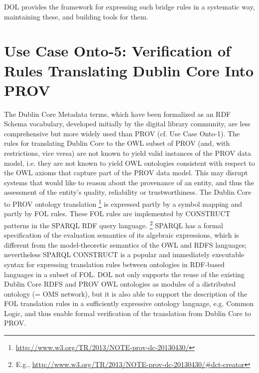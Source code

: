 \documentclass[10pt,fleqn,%
\ifpretendfinal
final%
\else
draft%
\fi,
]{scrreprt}
\begin{document}
DOL  provides the framework for expressing such bridge rules in a systematic way, maintaining these, and building tools for them. 

\section{Use Case Onto-5: Verification of Rules Translating Dublin Core Into PROV}
The Dublin Core Metadata terms, which have been formalized as an RDF Schema vocabulary, developed initially by the digital library community, are less 
comprehensive but more widely used than PROV (cf. Use Case Onto-1). The rules for translating Dublin Core to the OWL subset of PROV (and, with restrictions, 
vice versa) are not known to yield valid instances of the PROV data model, i.e. they are not known to yield OWL ontologies consistent with respect to the OWL axioms that 
capture part of the PROV data model. This may disrupt systems that would like to reason about the provenance of an entity, and thus the assessment of the 
entity's quality, reliability or trustworthiness.
The Dublin Core to PROV ontology translation%
\footnote{\url{http://www.w3.org/TR/2013/NOTE-prov-dc-20130430/}}
  is expressed partly by a symbol mapping and partly by FOL rules. These FOL rules are implemented by CONSTRUCT patterns in the SPARQL RDF query language.%
\footnote{E.g., \url{http://www.w3.org/TR/2013/NOTE-prov-dc-20130430/\#dct-creator}} 
SPARQL has a formal specification of the evaluation semantics of its algebraic expressions, which is different from the model-theoretic semantics of the OWL and RDFS languages; nevertheless SPARQL CONSTRUCT is a popular and immediately executable syntax for expressing translation rules between ontologies in RDF-based languages in a subset of FOL.
DOL  not only supports the reuse of the existing Dublin Core RDFS and PROV OWL ontologies as modules of a distributed ontology (= OMS network), but it is also able to support the description of the FOL translation rules in a sufficiently expressive ontology language, e.g. Common Logic, and thus enable formal verification of the translation from Dublin Core to PROV.
\end{document}
